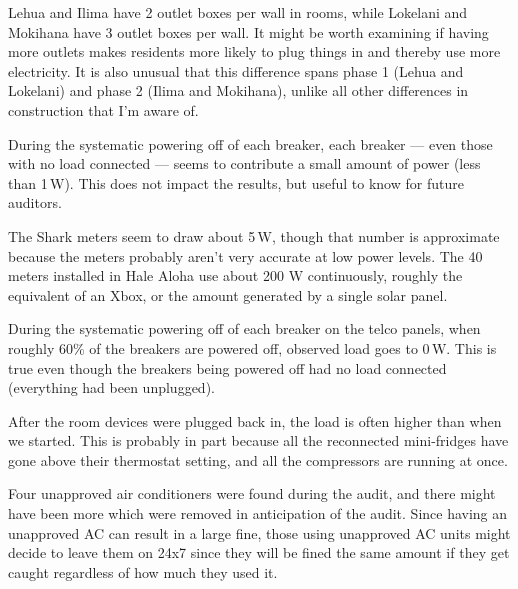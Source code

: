 \documentclass[11pt,draft]{article}
\newcommand{\W}{\,W\xspace}
\begin{document}
Lehua and Ilima have 2 outlet boxes per wall in rooms, while Lokelani and Mokihana have 3 outlet boxes per wall. It might be worth examining if having more outlets makes residents more likely to plug things in and thereby use more electricity. It is also unusual that this difference spans phase 1 (Lehua and Lokelani) and phase 2 (Ilima and Mokihana), unlike all other differences in construction that I'm aware of.

During the systematic powering off of each breaker, each breaker --- even those with no load connected --- seems to contribute a small amount of power (less than 1\W). This does not impact the results, but useful to know for future auditors.

The Shark meters seem to draw about 5\W, though that number is approximate because the meters probably aren't very accurate at low power levels. The 40 meters installed in Hale Aloha use about 200 W continuously, roughly the equivalent of an Xbox, or the amount generated by a single solar panel.

During the systematic powering off of each breaker on the telco panels, when roughly 60\% of the breakers are powered off, observed load goes to 0\W. This is true even though the breakers being powered off had no load connected (everything had been unplugged).

After the room devices were plugged back in, the load is often higher than when we started. This is probably in part because all the reconnected mini-fridges have gone above their thermostat setting, and all the compressors are running at once.

Four unapproved air conditioners were found during the audit, and there might have been more which were removed in anticipation of the audit. Since having an unapproved AC can result in a large fine, those using unapproved AC units might decide to leave them on 24x7 since they will be fined the same amount if they get caught regardless of how much they used it.



%
%
%
%
\end{document}
